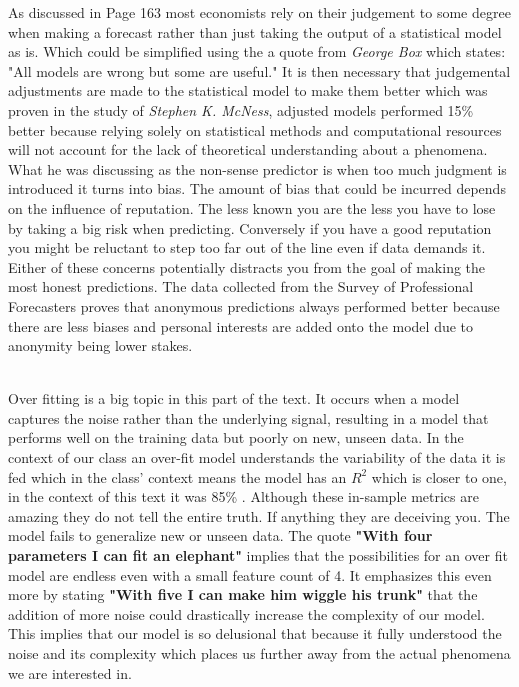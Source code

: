 \documentclass[12pt]{article}
\begin{document}
\begin{enumerate}
As discussed in Page 163 most economists rely on their judgement to some degree when making a forecast rather than just taking the output of a statistical model as is. Which could be simplified using the a quote from \textit{George Box} which states: "All models are wrong but some are useful." It is then necessary that judgemental adjustments are made to the statistical model to make them better which was proven in the study of \textit{Stephen K. McNess}, adjusted models performed 15\% better because relying solely on statistical methods and computational resources will not account for the lack of theoretical understanding about a phenomena. What he was discussing as the non-sense predictor is when too much judgment is introduced it turns into bias. The amount of bias that could be incurred depends on the influence of reputation. The less known you are the less you have to lose by taking a big risk when predicting. Conversely if you have a good reputation you might be reluctant to step too far out of the line even if data demands it. Either of these concerns potentially distracts you from the goal of making the most honest predictions. The data collected from the Survey of Professional Forecasters proves that anonymous predictions always performed better because there are less biases and personal interests are added onto the model due to anonymity being lower stakes.

 \\ 

Over fitting is a big topic in this part of the text. It occurs when a model captures the noise rather than the underlying signal, resulting in a model that performs well on the training data but poorly on new, unseen data. In the context of our class an over-fit model understands the variability of the data it is fed which in the class' context means the model has an \( R^2\) which is closer to one, in the context of this text it was 85\% . Although these in-sample metrics are amazing they do not tell the entire truth. If anything they are deceiving you. The model fails to generalize new or unseen data. The quote \textbf{"With four parameters I can fit an elephant"} implies that the possibilities for an over fit model are endless even with a small feature count of 4. It emphasizes this even more by stating \textbf{"With five I can make him wiggle his trunk"} that the addition of more noise could drastically increase the complexity of our model. This implies that our model is so delusional that because it fully understood the noise and its complexity which places us further away from the actual phenomena we are interested in.  \\ \\ \\ \\


\end{enumerate}
\end{document}
